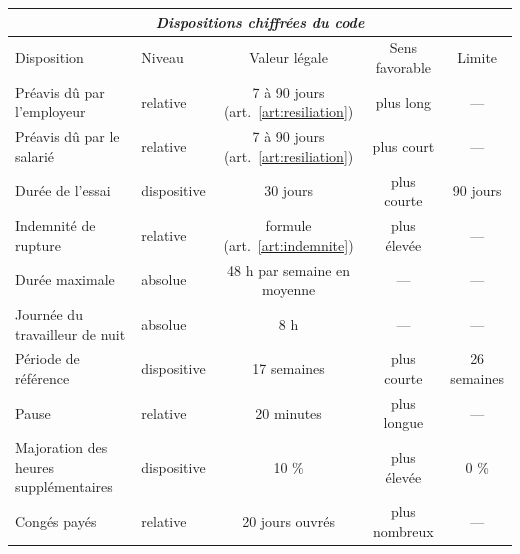 \begin{center}
\footnotesize
\begin{tabular}{llccc}
  \multicolumn{5}{c}{\textit{Dispositions chiffrées du code}} \\[0.3em]
  \hline
  Disposition & Niveau & Valeur légale & Sens favorable & Limite \\
  \hline
  Préavis dû par l'employeur & relative & 7 à 90 jours (art.~\ref{art:resiliation}) & plus long & --- \\
  Préavis dû par le salarié & relative & 7 à 90 jours (art.~\ref{art:resiliation}) & plus court & --- \\
  Durée de l'essai & dispositive & 30 jours & plus courte & 90 jours \\
  Indemnité de rupture & relative & formule (art.~\ref{art:indemnite}) & plus élevée & --- \\
  Durée maximale & absolue & 48 h par semaine en moyenne & --- & --- \\
  Journée du travailleur de nuit & absolue & 8 h & --- & --- \\
  Période de référence & dispositive & 17 semaines & plus courte & 26 semaines \\
  Pause & relative & 20 minutes & plus longue & --- \\
  Majoration des heures supplémentaires & dispositive & 10 \% & plus élevée & 0 \% \\
  Congés payés & relative & 20 jours ouvrés & plus nombreux & --- \\
  \hline
\end{tabular}
\end{center}
